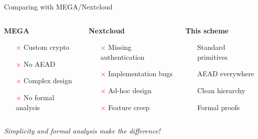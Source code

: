 \documentclass[aspectratio=169, lualatex, handout]{beamer}
\begin{document}
\begin{frame}{Comparing with MEGA/Nextcloud}
	\begin{columns}[c]
		\begin{column}{0.33\textwidth}
			\textbf{MEGA}
			\begin{itemize}
				\item[\textcolor{red}{$\times$}] Custom crypto
				\item[\textcolor{red}{$\times$}] No AEAD
				\item[\textcolor{red}{$\times$}] Complex design
				\item[\textcolor{red}{$\times$}] No formal analysis
			\end{itemize}
		\end{column}
		\begin{column}{0.33\textwidth}
			\textbf{Nextcloud}
			\begin{itemize}
				\item[\textcolor{red}{$\times$}] Missing authentication
				\item[\textcolor{red}{$\times$}] Implementation bugs
				\item[\textcolor{red}{$\times$}] Ad-hoc design
				\item[\textcolor{red}{$\times$}] Feature creep
			\end{itemize}
		\end{column}
		\begin{column}{0.34\textwidth}
			\textbf{This scheme}
			\begin{itemize}
				\item[\textcolor{green}{\mycheckmark}] Standard primitives
				\item[\textcolor{green}{\mycheckmark}] AEAD everywhere
				\item[\textcolor{green}{\mycheckmark}] Clean hierarchy
				\item[\textcolor{green}{\mycheckmark}] Formal proofs
			\end{itemize}
		\end{column}
	\end{columns}
	\vspace{0.5cm}
	\begin{center}
		\textit{Simplicity and formal analysis make the difference!}
	\end{center}
\end{frame}
\end{document}
